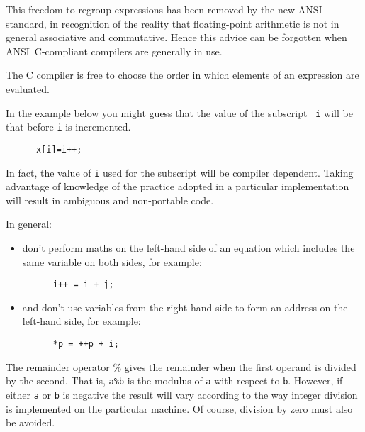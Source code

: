 {\ansi This freedom to regroup expressions has been removed by the 
new ANSI standard, in 
recognition of the reality that floating-point arithmetic is not in general
associative and commutative. Hence this advice can be forgotten
when ANSI~C-compliant compilers are generally in use.}




The C compiler is free to choose the order in which elements of an expression 
are evaluated. 

In the example below you might guess that the value of the subscript {\tt 
i} will be that before {\tt i} is incremented.
\begin{verbatim}
      x[i]=i++;
\end{verbatim}

In fact, the value of {\tt i} used for the subscript will be compiler dependent.
Taking advantage of knowledge of the practice adopted in a particular 
implementation will result in ambiguous and non-portable code.

In general:
\begin{itemize}
\item don't perform maths on the left-hand side of an equation which
includes the same variable on both sides, for example: 
\begin{verbatim}
      i++ = i + j;
\end{verbatim}
\item and don't use variables from the right-hand side to form an address
on the left-hand side, for example: 
\begin{verbatim}
      *p = ++p + i;
\end{verbatim}

\end{itemize}



The remainder operator \% gives the remainder when the first operand is
divided by the second. That is, {\tt a\%b} is the modulus of {\tt a} 
with respect to {\tt b}.
However, if either {\tt a} or {\tt b} is negative the result will vary according to the
way integer division is implemented on the particular machine.
Of course, division by zero must also be avoided.



